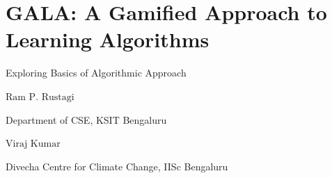 \chapter{GALA: A Gamified Approach to Learning Algorithms}

\vskip -12pt

\centerline{{\LARGE Exploring Basics of Algorithmic Approach}}

\vskip 0.8cm

\begin{center}
{\large\uppercase{$\text{Ram P. Rustagi}$}} 

\vskip -6pt

Department of CSE, KSIT Bengaluru

\end{center}

\vskip 1cm

\begin{center}
{\large\uppercase{$\text{Viraj Kumar}$}} 

\vskip -6pt

Divecha Centre for Climate Change, IISc Bengaluru

\end{center}



\vfill




\newpage

